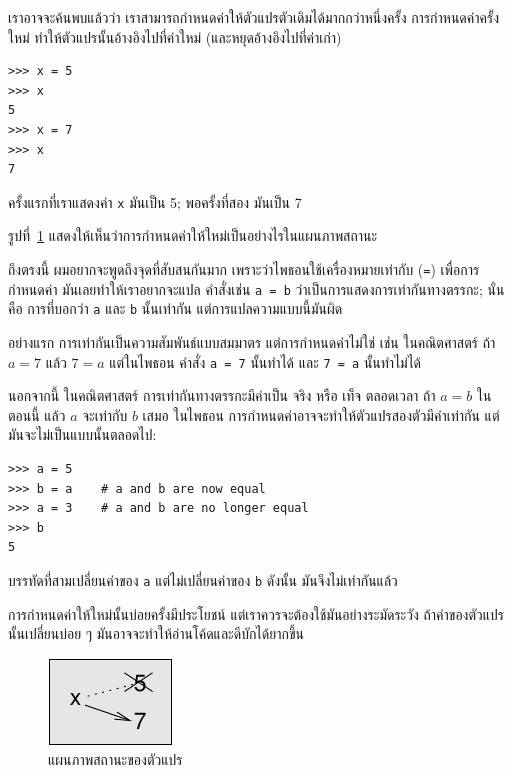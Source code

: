 เราอาจจะค้นพบแล้วว่า เราสามารถกำหนดค่าให้ตัวแปรตัวเดิมได้มากกว่าหนึ่งครั้ง การกำหนดค่าครั้งใหม่
ทำให้ตัวแปรนั้นอ้างอิงไปที่ค่าใหม่ (และหยุดอ้างอิงไปที่ค่าเก่า)

\begin{verbatim}
>>> x = 5
>>> x
5
>>> x = 7
>>> x
7
\end{verbatim}
%
ครั้งแรกที่เราแสดงค่า {\tt x} มันเป็น 5; พอครั้งที่สอง มันเป็น 7

รูปที่~\ref{fig.assign2} แสดงให้เห็นว่าการกำหนดค่าให้ใหม่เป็นอย่างไรในแผนภาพสถานะ 
 
 

ถึงตรงนี้ ผมอยากจะพูดถึงจุดที่สับสนกันมาก
เพราะว่าไพธอนใช้เครื่องหมายเท่ากับ ({\tt =}) เพื่อการกำหนดค่า มันเลยทำให้เราอยากจะแปล
คำสั่งเช่น {\tt a = b} ว่าเป็นการแสดงการเท่ากันทางตรรกะ; นั่นคือ การที่บอกว่า 
{\tt a} และ {\tt b} นั้นเท่ากัน  แต่การแปลความแบบนี้มันผิด

อย่างแรก การเท่ากันเป็นความสัมพันธ์แบบสมมาตร แต่การกำหนดค่าไม่ใช่ เช่น ในคณิตศาสตร์
ถ้า {\scriptsize$a=7$} แล้ว {\scriptsize$7=a$}  
แต่ในไพธอน คำสั่ง {\tt a = 7} นั้นทำได้ และ {\tt 7 = a} นั้นทำไม่ได้

นอกจากนี้ ในคณิตศาสตร์ การเท่ากันทางตรรกะมีค่าเป็น จริง หรือ เท็จ ตลอดเวลา ถ้า {\scriptsize$a=b$} ในตอนนี้ 
แล้ว {\scriptsize$a$} จะเท่ากับ {\scriptsize$b$} เสมอ  ในไพธอน การกำหนดค่าอาจจะทำให้ตัวแปรสองตัวมีค่าเท่ากัน 
แต่มันจะไม่เป็นแบบนั้นตลอดไป:

\begin{verbatim}
>>> a = 5
>>> b = a    # a and b are now equal
>>> a = 3    # a and b are no longer equal
>>> b
5
\end{verbatim}
% 
บรรทัดที่สามเปลี่ยนค่าของ {\tt a} แต่ไม่เปลี่ยนค่าของ {\tt b} ดังนั้น มันจึงไม่เท่ากันแล้ว

การกำหนดค่าให้ใหม่นั้นบ่อยครั้งมีประโยชน์ แต่เราควรจะต้องใช้มันอย่างระมัดระวัง 
ถ้าค่าของตัวแปรนั้นเปลี่ยนบ่อย ๆ มันอาจจะทำให้อ่านโค้ดและดีบักได้ยากขึ้น

\begin{figure}
\centerline
{\includegraphics[scale=0.8]{figs/assign2.pdf}}
\caption{แผนภาพสถานะของตัวแปร}
\label{fig.assign2}
\end{figure}



